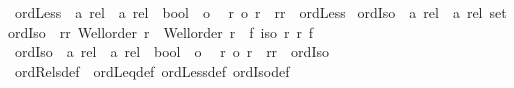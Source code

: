 \begin{isabellebody}
\ ordLess{}\ {\isacharcolon}{\kern0pt}{\isacharcolon}{\kern0pt}\ {\isachardoublequoteopen}{\isacharprime}{\kern0pt}a\ rel\ {\isasymRightarrow}\ {\isacharprime}{\kern0pt}a{\isacharprime}{\kern0pt}\ rel\ {\isasymRightarrow}\ bool{\isachardoublequoteclose}\ {\isacharparenleft}{\kern0pt}\ {\isachardoublequoteopen}{\isacharless}{\kern0pt}o{\isachardoublequoteclose}\ {}{}{\isacharparenright}{\kern0pt}\isanewline
{}\ {\isachardoublequoteopen}r\ {\isacharless}{\kern0pt}o\ r{\isacharprime}{\kern0pt}\ {\isasymequiv}\ {\isacharparenleft}{\kern0pt}r{\isacharcomma}{\kern0pt}r{\isacharprime}{\kern0pt}{\isacharparenright}{\kern0pt}\ {\isasymin}\ ordLess{\isachardoublequoteclose}\isanewline
\isanewline
{}\isamarkupfalse%
\ ordIso\ {\isacharcolon}{\kern0pt}{\isacharcolon}{\kern0pt}\ {\isachardoublequoteopen}{\isacharparenleft}{\kern0pt}{\isacharprime}{\kern0pt}a\ rel\ {\isacharasterisk}{\kern0pt}\ {\isacharprime}{\kern0pt}a{\isacharprime}{\kern0pt}\ rel{\isacharparenright}{\kern0pt}\ set{\isachardoublequoteclose}\isanewline
{}\isanewline
{\isachardoublequoteopen}ordIso\ {\isacharequal}{\kern0pt}\ {\isacharbraceleft}{\kern0pt}{\isacharparenleft}{\kern0pt}r{\isacharcomma}{\kern0pt}r{\isacharprime}{\kern0pt}{\isacharparenright}{\kern0pt}{\isachardot}{\kern0pt}\ Well{\isacharunderscore}{\kern0pt}order\ r\ {\isasymand}\ Well{\isacharunderscore}{\kern0pt}order\ r{\isacharprime}{\kern0pt}\ {\isasymand}\ {\isacharparenleft}{\kern0pt}{\isasymexists}f{\isachardot}{\kern0pt}\ iso\ r\ r{\isacharprime}{\kern0pt}\ f{\isacharparenright}{\kern0pt}{\isacharbraceright}{\kern0pt}{\isachardoublequoteclose}\isanewline
\isanewline
{}\isamarkupfalse%
\ ordIso{}\ {\isacharcolon}{\kern0pt}{\isacharcolon}{\kern0pt}\ {\isachardoublequoteopen}{\isacharprime}{\kern0pt}a\ rel\ {\isasymRightarrow}\ {\isacharprime}{\kern0pt}a{\isacharprime}{\kern0pt}\ rel\ {\isasymRightarrow}\ bool{\isachardoublequoteclose}\ {\isacharparenleft}{\kern0pt}\ {\isachardoublequoteopen}{\isacharequal}{\kern0pt}o{\isachardoublequoteclose}\ {}{}{\isacharparenright}{\kern0pt}\isanewline
{}\ {\isachardoublequoteopen}r\ {\isacharequal}{\kern0pt}o\ r{\isacharprime}{\kern0pt}\ {\isasymequiv}\ {\isacharparenleft}{\kern0pt}r{\isacharcomma}{\kern0pt}r{\isacharprime}{\kern0pt}{\isacharparenright}{\kern0pt}\ {\isasymin}\ ordIso{\isachardoublequoteclose}\isanewline
\isanewline
{}\isamarkupfalse%
\ ordRels{\isacharunderscore}{\kern0pt}def\ {\isacharequal}{\kern0pt}\ ordLeq{\isacharunderscore}{\kern0pt}def\ ordLess{\isacharunderscore}{\kern0pt}def\ ordIso{\isacharunderscore}{\kern0pt}def\isanewline

\end{isabellebody}

